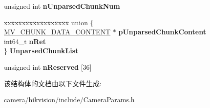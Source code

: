 \begin{DoxyCompactItemize}
\item 
\mbox{\label{struct___m_v___f_r_a_m_e___o_u_t___i_n_f_o___e_x___a7557adbd395489a4771a5bd5656c2a59}} 
unsigned int {\bfseries n\+Unparsed\+Chunk\+Num}
\item 
\mbox{\label{struct___m_v___f_r_a_m_e___o_u_t___i_n_f_o___e_x___a535850e43a33edfe69a713da4570bb71}} 
\begin{tabbing}
xx\=xx\=xx\=xx\=xx\=xx\=xx\=xx\=xx\=\kill
union \{\\
\>\hyperlink{struct___m_v___c_h_u_n_k___d_a_t_a___c_o_n_t_e_n_t__}{MV\_CHUNK\_DATA\_CONTENT} $\ast$ {\bfseries pUnparsedChunkContent}\\
\>int64\_t {\bfseries nRet}\\
\} {\bfseries UnparsedChunkList}\\

\end{tabbing}\item 
\mbox{\label{struct___m_v___f_r_a_m_e___o_u_t___i_n_f_o___e_x___a6b17b8a0650007d00bfeed305a99d37b}} 
unsigned int {\bfseries n\+Reserved} \mbox{[}36\mbox{]}
\end{DoxyCompactItemize}


该结构体的文档由以下文件生成\+:\begin{DoxyCompactItemize}
\item 
camera/hikvision/include/Camera\+Params.\+h\end{DoxyCompactItemize}
